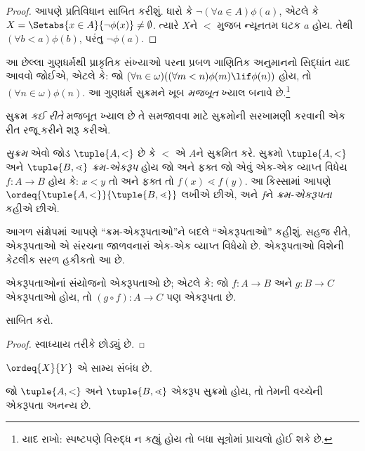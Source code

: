 \begin{proof}
આપણે પ્રતિવિધાન સાબિત કરીશું. ધારો કે $\lnot(\forall a \in
A)\phi(a)$, એટલે કે $X = \Setabs{x \in A}{\lnot\phi(x)} \neq
\emptyset$. ત્યારે $X$ને $<$ મુજબ ન્યૂનતમ ઘટક $a$
હોય. તેથી $(\forall
b < a)\phi(b)$, પરંતુ $\lnot \phi(a)$.
\end{proof}\noindent આ છેલ્લા ગુણધર્મથી પ્રાકૃતિક સંખ્યાઓ પરના
પ્રબળ ગાણિતિક અનુમાનનો સિદ્ધાંત યાદ આવવો જોઈએ, એટલે કે:
જો $(\forall n \in \omega)((\forall m < n)\phi(m)
\lif \phi(n))$ હોય, તો $(\forall n \in \omega)\phi(n)$.
આ ગુણધર્મ સુક્રમને ખૂબ \emph{મજબૂત} ખ્યાલ બનાવે છે.\footnote{
યાદ રાખો: સ્પષ્ટપણે વિરુદ્ધ ન કહ્યું હોય તો બધા સૂત્રોમાં
પ્રાચલો હોઈ શકે છે.}
\endgroup

\begingroup
\makeatletter{}\makeatother

\label{guunit:OLP-0551}


સુક્રમ \emph{કઈ રીતે} મજબૂત ખ્યાલ છે તે સમજાવવા માટે
સુક્રમોની સરખામણી કરવાની એક રીત રજૂ કરીને શરૂ કરીએ.

\begin{defn}
\emph{સુક્રમ} એવો જોડ $\tuple{A, <}$ છે કે $<$ એ $A$ને
સુક્રમિત કરે. સુક્રમો $\tuple{A, <}$ અને $\tuple{B,
\lessdot}$ \emph{ક્રમ-એકરૂપ} હોય જો અને ફક્ત જો એવું
એક-એક વ્યાપ્ત વિધેય $f \colon A \to B$ હોય કે:
$x < y$ તો અને ફક્ત તો $f(x) \lessdot  f(y)$.
આ કિસ્સામાં આપણે
$\ordeq{\tuple{A, <}}{\tuple{B, \lessdot}}$ લખીએ છીએ,
અને $f$ને \emph{ક્રમ-એકરૂપતા} કહીએ છીએ.
\end{defn}
\noindent
આગળ સંક્ષેપમાં આપણે “ક્રમ-એકરૂપતાઓ”ને બદલે “એકરૂપતાઓ”
કહીશું. સહજ રીતે, એકરૂપતાઓ એ સંરચના જાળવનારાં
એક-એક વ્યાપ્ત વિધેયો છે. એકરૂપતાઓ વિશેની કેટલીક સરળ હકીકતો આ છે.

\begin{lem}
એકરૂપતાઓનાં સંયોજનો એકરૂપતાઓ છે; એટલે કે:
જો $f \colon A
\to B$ અને $g \colon B \to C$ એકરૂપતાઓ હોય,
તો $(g \circ f)
\colon A \to C$ પણ એકરૂપતા છે.
\end{lem}
\begin{prob}
	 સાબિત કરો.
\end{prob}
\begin{proof}
સ્વાધ્યાય તરીકે છોડ્યું છે.
\end{proof}
\begin{cor}
	$\ordeq{X}{Y}$ એ સામ્ય સંબંધ છે.
\end{cor}
\begin{prop}
જો $\tuple{A, <}$ અને $\tuple{B, \lessdot}$ એકરૂપ સુક્રમો હોય,
તો તેમની વચ્ચેની એકરૂપતા અનન્ય છે.
\end{prop}

